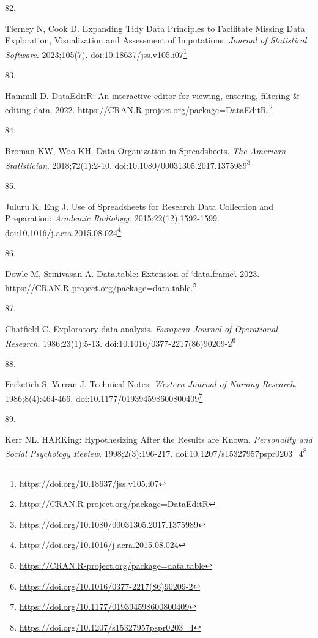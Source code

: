 \documentclass[
  a4paper,
]{book}
\newlength{\cslhangindent}
\newlength{\csllabelwidth}
\newlength{\cslentryspacingunit} %
\newenvironment{CSLReferences}[2] %
 {%
  \setlength{\parindent}{0pt}
  \ifodd #1
  \let\oldpar\par
  \def\par{\hangindent=\cslhangindent\oldpar}
  \fi
  \setlength{\parskip}{#2\cslentryspacingunit}
 }%
 {}
\newcommand{\CSLLeftMargin}[1]{\parbox[t]{\csllabelwidth}{#1}}
\newcommand{\CSLRightInline}[1]{\parbox[t]{\linewidth - \csllabelwidth}{#1}\break}
\renewcommand{\href}[2]{#2\footnote{\url{#1}}}
\begin{document}
\begin{CSLReferences}{0}{0}
\leavevmode{}%
\CSLLeftMargin{82. }%
\CSLRightInline{Tierney N, Cook D. Expanding Tidy Data Principles to Facilitate Missing Data Exploration, Visualization and Assessment of Imputations. \emph{Journal of Statistical Software}. 2023;105(7). doi:\href{https://doi.org/10.18637/jss.v105.i07}{10.18637/jss.v105.i07}}

\leavevmode{}%
\CSLLeftMargin{83. }%
\CSLRightInline{Hammill D. DataEditR: An interactive editor for viewing, entering, filtering \& editing data. 2022. \href{https://CRAN.R-project.org/package=DataEditR}{https://CRAN.R-project.org/package=DataEditR.}}

\leavevmode{}%
\CSLLeftMargin{84. }%
\CSLRightInline{Broman KW, Woo KH. Data Organization in Spreadsheets. \emph{The American Statistician}. 2018;72(1):2-10. doi:\href{https://doi.org/10.1080/00031305.2017.1375989}{10.1080/00031305.2017.1375989}}

\leavevmode{}%
\CSLLeftMargin{85. }%
\CSLRightInline{Juluru K, Eng J. Use of Spreadsheets for Research Data Collection and Preparation: \emph{Academic Radiology}. 2015;22(12):1592-1599. doi:\href{https://doi.org/10.1016/j.acra.2015.08.024}{10.1016/j.acra.2015.08.024}}

\leavevmode{}%
\CSLLeftMargin{86. }%
\CSLRightInline{Dowle M, Srinivasan A. Data.table: Extension of `data.frame`. 2023. \href{https://CRAN.R-project.org/package=data.table}{https://CRAN.R-project.org/package=data.table.}}

\leavevmode{}%
\CSLLeftMargin{87. }%
\CSLRightInline{Chatfield C. Exploratory data analysis. \emph{European Journal of Operational Research}. 1986;23(1):5-13. doi:\href{https://doi.org/10.1016/0377-2217(86)90209-2}{10.1016/0377-2217(86)90209-2}}

\leavevmode{}%
\CSLLeftMargin{88. }%
\CSLRightInline{Ferketich S, Verran J. Technical Notes. \emph{Western Journal of Nursing Research}. 1986;8(4):464-466. doi:\href{https://doi.org/10.1177/019394598600800409}{10.1177/019394598600800409}}

\leavevmode{}%
\CSLLeftMargin{89. }%
\CSLRightInline{Kerr NL. HARKing: Hypothesizing After the Results are Known. \emph{Personality and Social Psychology Review}. 1998;2(3):196-217. doi:\href{https://doi.org/10.1207/s15327957pspr0203_4}{10.1207/s15327957pspr0203\_4}}


\end{CSLReferences}
\end{document}
